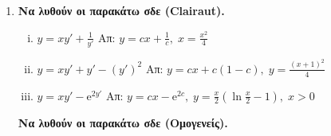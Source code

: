 \documentclass[a4paper,table]{report}
\begin{document}
\begin{enumerate}


  \item \textbf{Να λυθούν οι παρακάτω σδε (Clairaut).} 
    \begin{enumerate}[i)]
      \item $ y = xy' + \frac{1}{y'} $ \hfill Απ: $ y=cx+ \frac{1}{c}, \; x =
        \frac{x^{2}}{4} $ 
      \item $ y = xy' + y' - (y')^{2} $ \hfill Απ: $ y=cx+c(1-c), \; y=
        \frac{(x+1)^{2}}{4} $ 
      \item $ y=xy'- \mathrm{e}^{2y'} $ \hfill Απ: $ y=cx- \mathrm{e}^{2c}, \; y =
        \frac{x}{2} (\ln{\frac{x}{2}} -1), \; x>0 $ 
    \end{enumerate}

\textbf{Να λυθούν οι παρακάτω σδε (Ομογενείς).}


\end{enumerate}
\end{document}
